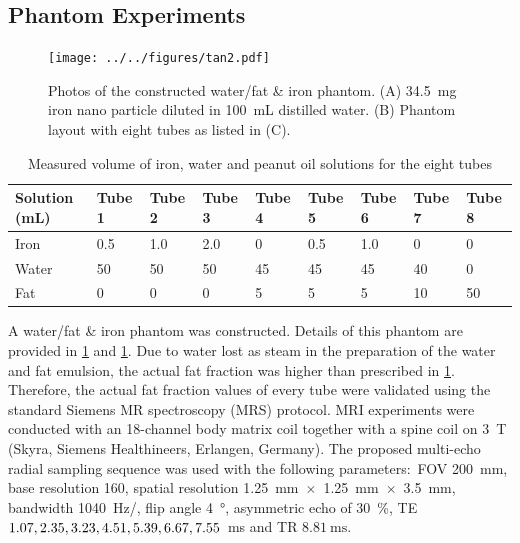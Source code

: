 \documentclass[journal,twoside,web]{ieeecolor}
\newcommand{\splitatcommas}[1]{%
	\begingroup
	\begingroup\lccode`~=`, \lowercase{\endgroup
		\edef~{\mathchar\the\mathcode`, \penalty0 \noexpand\hspace{0pt plus 1em}}%
	}\mathcode`,="8000 #1%
	\endgroup
}
\begin{document}
\subsection{Phantom Experiments}

\begin{figure}
	\centering
	\texttt{[image: ../../figures/tan2.pdf]}
	\caption{Photos of the constructed water/fat \& iron phantom. 
			(A) 34.5~mg iron nano particle diluted in 100~mL distilled water.
			(B) Phantom layout with eight tubes as listed in (C).}
	\label{FIG:PHA_WFIRON}
\end{figure}

\begin{table}[t]
	\caption{Measured volume of iron, water and peanut oil solutions for the eight tubes}
	\setlength{\tabcolsep}{3pt}
	\begin{tabular}{m{} m{} m{} m{} m{} m{} m{} m{} m{}}
			\toprule
			Solution (\si{\milli\liter}) & Tube 1 & Tube 2 & Tube 3 & Tube 4 & Tube 5 & Tube 6 & Tube 7 & Tube 8 \\
			\hline
			Iron  &  0.5 &  1.0 &  2.0 &  0 &  0.5 &  1.0 &  0 &  0 \\
			Water & 50   & 50   & 50   & 45 & 45   & 45   & 40 &  0 \\
			Fat   &  0   &  0   &  0   &  5 &  5   &  5   & 10 & 50 \\
			\bottomrule
		\end{tabular}
	\label{TAB:PHA}
\end{table}

A water/fat \& iron phantom \cite{hines_2009_wfiron,bush_2018_fat} was constructed. 
Details of this phantom are provided in \cref{FIG:PHA_WFIRON} and \cref{TAB:PHA}. 
Due to water lost as steam in the preparation of the water and fat emulsion, 
the actual fat fraction was higher than prescribed in \cref{TAB:PHA}. 
Therefore, the actual fat fraction values of every tube were validated using 
the standard Siemens MR spectroscopy (MRS) protocol.
MRI experiments were conducted with an 18-channel body matrix coil 
together with a spine coil on 
\SI{3}{\tesla} (Skyra, Siemens Healthineers, Erlangen, Germany). 
The proposed multi-echo radial sampling sequence was used 
with the following parameters:~FOV \SI{200}{\milli\metre}, 
base resolution 160, spatial resolution 
\SI{1.25}{\milli\meter}~$\times$~\SI{1.25}{\milli\meter}~$\times$~\SI{3.5}{\milli\meter},
bandwidth \SI{1040}{\hertz/\pixel}, flip angle \SI{4}{\degree}, 
asymmetric echo \cite{untenberger_2016_asym} of \SI{30}{\percent}, 
TE $\splitatcommas{1.07, 2.35, 3.23, 4.51, 5.39, 6.67, 7.55}$~\si{\ms} 
and TR $\SI{8.81}{\ms}$. 
\end{document}
